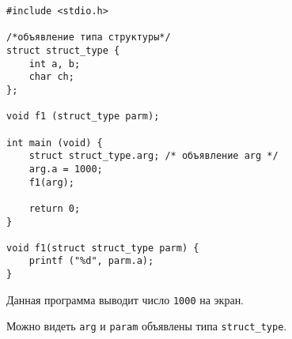 \begin{verbatim}
#include <stdio.h>

/*объявление типа структуры*/
struct struct_type { 
    int a, b;
    char ch;
};

void f1 (struct_type parm);

int main (void) { 
    struct struct_type.arg; /* объявление arg */
    arg.a = 1000;
    f1(arg);

    return 0;
}

void f1(struct struct_type parm) { 
    printf ("%d", parm.a);
}
\end{verbatim}

Данная программа выводит число \texttt{1000} на экран.

Можно видеть \texttt{arg} и \texttt{param} объявлены типа \texttt{struct\_type}.
